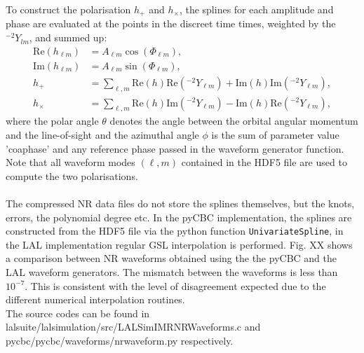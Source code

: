 \documentclass[a4paper, 11pt]{article}
\begin{document}
To construct the polarisation $h_+$ and $h_\times$, the splines for each amplitude and phase are evaluated at the points in the discreet time times, 
weighted by the ${}^{-2}Y_{lm}$, and summed up:
\begin{align}
\label{}
    \mathrm{Re}(h_{\ell m}) &= A_{\ell m} \cos(\Phi_{\ell m}),   \\
    \mathrm{Im}(h_{\ell m}) &= A_{\ell m} \sin(\Phi_{\ell m}),   \\
    h_+ &= \sum_{\ell, m} \mathrm{Re}(h) \mathrm{Re}({}^{-2}Y_{\ell m}) + \mathrm{Im}(h) \mathrm{Im}({}^{-2}Y_{\ell m}), \\
    h_\times &= \sum_{\ell, m} \mathrm{Re}(h) \mathrm{Im}({}^{-2}Y_{\ell m}) - \mathrm{Im}(h) \mathrm{Re}({}^{-2}Y_{\ell m}),
\end{align}
where the polar angle $\theta$ denotes the angle between the orbital angular momentum and the line-of-sight and the azimuthal
angle $\phi$ is the sum of parameter value 'coa\textunderscore phase' and any reference phase passed in the waveform generator function.
\\
Note that all waveform modes $(\ell, m)$ contained in the HDF5 file are used
to compute the two polarisations. \\
\\
The compressed NR data files do not store the splines themselves, but the knots, errors, the polynomial degree etc. In the pyCBC implementation,
the splines are constructed from the HDF5 file via the python function \texttt{UnivariateSpline}, in the LAL implementation regular GSL interpolation
is performed. Fig. XX shows a comparison between NR waveforms obtained using the the pyCBC and the LAL waveform generators. The mismatch
between the waveforms is less than $10^{-7}$. This is consistent with the level of disagreement expected due to the different numerical interpolation
routines. \\
The source codes can be found in lalsuite/lalsimulation/src/LALSimIMRNRWaveforms.c and 
pycbc/pycbc/waveforms/nr\textunderscore waveform.py respectively.

\end{document}
